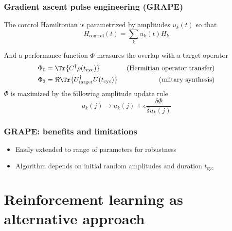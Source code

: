 \documentclass{beamer}
\begin{document}
\begin{frame}
\frametitle{Gradient ascent pulse engineering (GRAPE)}

The control Hamiltonian is parametrized by amplitudes $u_k(t)$ so that
\begin{equation}
    H_\text{control}(t) = \sum_k u_k(t) H_k
\end{equation}

And a performance function $\Phi$ measures the overlap with a target operator
\begin{align*}
    \Phi_0 &= \Tr{C^\dagger \rho(t_\text{cyc})} &
        \text{ (Hermitian operator transfer)} \\
    \Phi_3 &= \Re \Tr{U_\text{target}^\dagger U(t_\text{cyc})} &
        \text{ (unitary synthesis)}
\end{align*}
$\Phi$ is maximized by the following amplitude update rule
\begin{equation}
    u_k(j) \to u_k(j) + \epsilon \frac{\delta \Phi}{\delta u_k(j)}
\end{equation}

\end{frame}

\begin{frame}
\frametitle{GRAPE: benefits and limitations}

\begin{itemize}
    \item Easily extended to range of parameters for robustness
    \item Algorithm depends on initial random amplitudes and duration $t_\text{cyc}$
\end{itemize}
\end{frame}

\section{Reinforcement learning as alternative approach}
\end{document}
